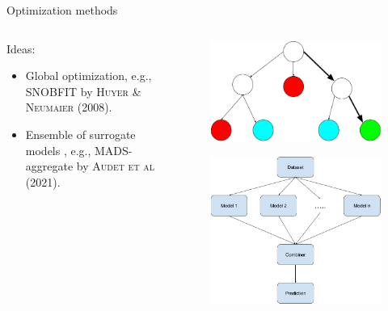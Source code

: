 \documentclass{beamer}
\begin{document}
\begin{frame}{Optimization methods}
    \begin{columns}
        \begin{column}{0.6\textwidth}
        Ideas:
             \begin{itemize}
                \item Global optimization, e.g., SNOBFIT by \textsc{Huyer \& Neumaier} (2008).
                \item Ensemble of surrogate models , e.g., MADS-aggregate by \textsc{Audet et al} (2021).
            \end{itemize}
        \end{column}
        \begin{column}{0.5\textwidth}
            \begin{figure}[h]
                \includegraphics[scale=0.17]{img/slide/BnB.png}
                \label{fig:perform}
            \end{figure}
            \vspace{0.1cm}
            \begin{figure}[h]
                \includegraphics[scale=0.2]{img/slide/ensemble.png}

\end{figure}
\end{column}
\end{columns}
\end{frame}
\end{document}
